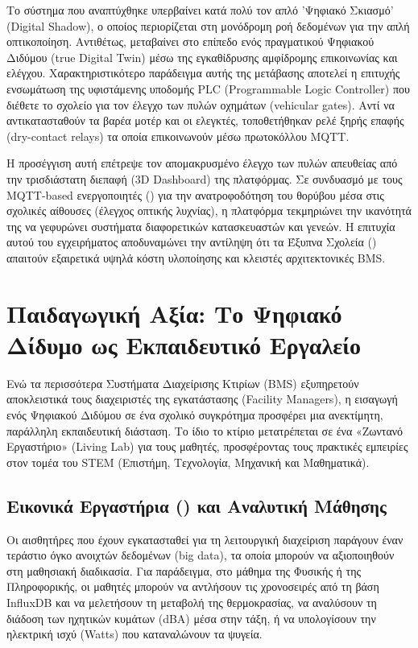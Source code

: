 Το σύστημα που αναπτύχθηκε υπερβαίνει κατά πολύ τον απλό 'Ψηφιακό Σκιασμό' (Digital Shadow), ο οποίος περιορίζεται στη μονόδρομη ροή δεδομένων για την απλή οπτικοποίηση. Αντιθέτως, μεταβαίνει στο επίπεδο ενός πραγματικού Ψηφιακού Διδύμου (true Digital Twin) μέσω της εγκαθίδρυσης αμφίδρομης επικοινωνίας και ελέγχου. Χαρακτηριστικότερο παράδειγμα αυτής της μετάβασης αποτελεί η επιτυχής ενσωμάτωση της υφιστάμενης υποδομής PLC (Programmable Logic Controller) που διέθετε το σχολείο για τον έλεγχο των πυλών οχημάτων (vehicular gates). Αντί να αντικατασταθούν τα βαρέα μοτέρ και οι ελεγκτές, τοποθετήθηκαν ρελέ ξηρής επαφής (dry-contact relays) τα οποία επικοινωνούν μέσω πρωτοκόλλου MQTT.

Η προσέγγιση αυτή επέτρεψε τον απομακρυσμένο έλεγχο των πυλών απευθείας από την τρισδιάστατη διεπαφή (3D Dashboard) της πλατφόρμας. Σε συνδυασμό με τους MQTT-based ενεργοποιητές () για την ανατροφοδότηση του θορύβου μέσα στις σχολικές αίθουσες (έλεγχος οπτικής λυχνίας), η πλατφόρμα τεκμηριώνει την ικανότητά της να γεφυρώνει συστήματα διαφορετικών κατασκευαστών και γενεών. Η επιτυχία αυτού του εγχειρήματος αποδυναμώνει την αντίληψη ότι τα Έξυπνα Σχολεία () απαιτούν εξαιρετικά υψηλά κόστη υλοποίησης και κλειστές αρχιτεκτονικές BMS.

\section{Παιδαγωγική Αξία: Το Ψηφιακό Δίδυμο ως Εκπαιδευτικό Εργαλείο}
Ενώ τα περισσότερα Συστήματα Διαχείρισης Κτιρίων (BMS) εξυπηρετούν αποκλειστικά τους διαχειριστές της εγκατάστασης (Facility Managers), η εισαγωγή ενός Ψηφιακού Διδύμου σε ένα σχολικό συγκρότημα προσφέρει μια ανεκτίμητη, παράλληλη εκπαιδευτική διάσταση. Το ίδιο το κτίριο μετατρέπεται σε ένα «Ζωντανό Εργαστήριο» (Living Lab) για τους μαθητές, προσφέροντας τους πρακτικές εμπειρίες στον τομέα του STEM (Επιστήμη, Τεχνολογία, Μηχανική και Μαθηματικά).

\subsection{Εικονικά Εργαστήρια () και Αναλυτική Μάθησης}
Οι αισθητήρες που έχουν εγκατασταθεί για τη λειτουργική διαχείριση παράγουν έναν τεράστιο όγκο ανοιχτών δεδομένων (big data), τα οποία μπορούν να αξιοποιηθούν στη μαθησιακή διαδικασία. Για παράδειγμα, στο μάθημα της Φυσικής ή της Πληροφορικής, οι μαθητές μπορούν να αντλήσουν τις χρονοσειρές από τη βάση InfluxDB και να μελετήσουν τη μεταβολή της θερμοκρασίας, να αναλύσουν τη διάδοση των ηχητικών κυμάτων (dBA) μέσα στην τάξη, ή να υπολογίσουν την ηλεκτρική ισχύ (Watts) που καταναλώνουν τα ψυγεία.

